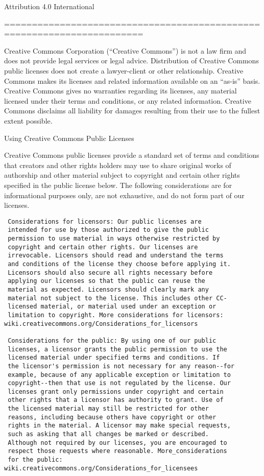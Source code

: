 \documentclass[]{article}
\date{}
\begin{document}
Attribution 4.0 International

=======================================================================

Creative Commons Corporation (``Creative Commons'') is not a law firm
and does not provide legal services or legal advice. Distribution of
Creative Commons public licenses does not create a lawyer-client or
other relationship. Creative Commons makes its licenses and related
information available on an ``as-is'' basis. Creative Commons gives no
warranties regarding its licenses, any material licensed under their
terms and conditions, or any related information. Creative Commons
disclaims all liability for damages resulting from their use to the
fullest extent possible.

Using Creative Commons Public Licenses

Creative Commons public licenses provide a standard set of terms and
conditions that creators and other rights holders may use to share
original works of authorship and other material subject to copyright and
certain other rights specified in the public license below. The
following considerations are for informational purposes only, are not
exhaustive, and do not form part of our licenses.

\begin{verbatim}
 Considerations for licensors: Our public licenses are
 intended for use by those authorized to give the public
 permission to use material in ways otherwise restricted by
 copyright and certain other rights. Our licenses are
 irrevocable. Licensors should read and understand the terms
 and conditions of the license they choose before applying it.
 Licensors should also secure all rights necessary before
 applying our licenses so that the public can reuse the
 material as expected. Licensors should clearly mark any
 material not subject to the license. This includes other CC-
 licensed material, or material used under an exception or
 limitation to copyright. More considerations for licensors:
wiki.creativecommons.org/Considerations_for_licensors

 Considerations for the public: By using one of our public
 licenses, a licensor grants the public permission to use the
 licensed material under specified terms and conditions. If
 the licensor's permission is not necessary for any reason--for
 example, because of any applicable exception or limitation to
 copyright--then that use is not regulated by the license. Our
 licenses grant only permissions under copyright and certain
 other rights that a licensor has authority to grant. Use of
 the licensed material may still be restricted for other
 reasons, including because others have copyright or other
 rights in the material. A licensor may make special requests,
 such as asking that all changes be marked or described.
 Although not required by our licenses, you are encouraged to
 respect those requests where reasonable. More_considerations
 for the public: 
wiki.creativecommons.org/Considerations_for_licensees
\end{verbatim}
\end{document}
